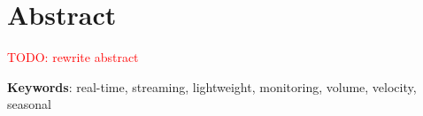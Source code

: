 \chapter*{Abstract}

 




\textcolor{red}{TODO: rewrite abstract}

\vspace*{10mm}\noindent
\textbf{Keywords}: real-time, streaming, lightweight, monitoring, volume, velocity, seasonal

